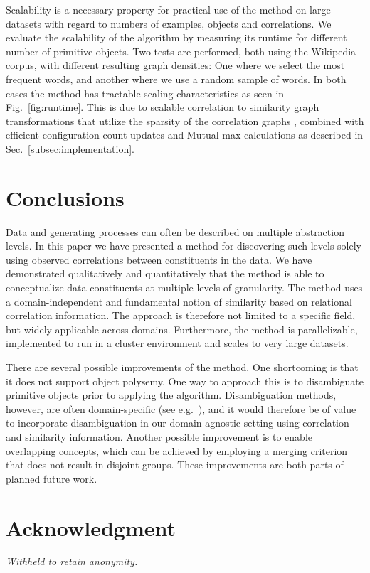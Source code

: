 \documentclass[conference]{IEEEtran}
\newcommand{\anonymize}[1]{\emph{Withheld to retain anonymity.}}
\newcommand{\fig}[1]{Fig.\ \ref{#1}}
\newcommand{\sn}[1]{Sec.\ \ref{#1}}
\begin{document}
Scalability is a necessary property for practical use of the method on large datasets with regard
to numbers of examples, objects and correlations.
We evaluate the scalability of the algorithm by measuring its runtime for different number of primitive objects.
Two tests are performed, both using the Wikipedia corpus, with different resulting graph densities: One where we select the most frequent words, 
and another where we use a random sample of words. In both cases the method has tractable scaling characteristics
as seen in \fig{fig:runtime}. This is due to scalable correlation to similarity graph transformations that 
utilize the sparsity of the correlation graphs \cite{Gornerup15}, combined with
efficient configuration count updates and Mutual max calculations as described in \sn{subsec:implementation}.

\section{Conclusions}
\label{sec:conclusions}
Data and generating processes can often be described on multiple abstraction levels. In this paper we have presented 
a method for discovering such levels solely using observed correlations between constituents in the data. 
We have demonstrated qualitatively and quantitatively that the method is able to conceptualize data constituents at 
multiple levels of granularity. The method uses a domain-independent and fundamental notion of similarity based on relational correlation information.
The approach is therefore not limited to a specific field, but widely applicable across domains. Furthermore, the method is parallelizable,
implemented to run in a cluster environment and scales to very large datasets. 

There are several possible improvements of the method. One shortcoming is that it does not support object polysemy.
One way to approach this is to disambiguate primitive objects prior to applying the algorithm. 
Disambiguation methods, however, are often domain-specific (see e.g.\ \cite{Cruys11}), and it would therefore be of value to incorporate disambiguation
in our domain-agnostic setting using correlation and similarity information. Another possible improvement is to enable 
overlapping concepts, which can be achieved by employing a merging criterion that does not result in disjoint groups.
These improvements are both parts of planned future work.

\section*{Acknowledgment}
\anonymize{This work was funded by the Swedish Foundation for Strategic Research (\emph{Stiftelsen f\"or strategisk forskning}) 
and the Knowledge Foundation (\emph{Stiftelsen f\"or kunskaps- och kompetensutveckling}). 
The authors would like to thank the anonymous reviewers for their valuable comments.}
\end{document}
